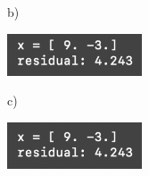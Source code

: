 b)

\begin{center}
    \includegraphics[width=0.3\textwidth]{prob5b.png} 
\end{center}

c)

\begin{center}
    \includegraphics[width=0.3\textwidth]{prob5c.png} 
\end{center}




